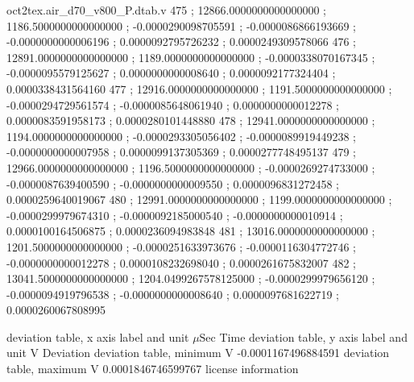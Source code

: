 \begin{filecontents}[overwrite]{oct2tex.air_d70_v800_P.dtab.v}
475 ; 12866.0000000000000000 ; 1186.5000000000000000 ; -0.0000290098705591 ; -0.0000086866193669 ; -0.0000000000006196 ; 0.0000092795726232 ; 0.0000249309578066
476 ; 12891.0000000000000000 ; 1189.0000000000000000 ; -0.0000338070167345 ; -0.0000095579125627 ; 0.0000000000008640 ; 0.0000092177324404 ; 0.0000338431564160
477 ; 12916.0000000000000000 ; 1191.5000000000000000 ; -0.0000294729561574 ; -0.0000085648061940 ; 0.0000000000012278 ; 0.0000083591958173 ; 0.0000280101448880
478 ; 12941.0000000000000000 ; 1194.0000000000000000 ; -0.0000293305056402 ; -0.0000089919449238 ; -0.0000000000007958 ; 0.0000099137305369 ; 0.0000277748495137
479 ; 12966.0000000000000000 ; 1196.5000000000000000 ; -0.0000269274733000 ; -0.0000087639400590 ; -0.0000000000009550 ; 0.0000096831272458 ; 0.0000259640019067
480 ; 12991.0000000000000000 ; 1199.0000000000000000 ; -0.0000299979674310 ; -0.0000092185000540 ; -0.0000000000010914 ; 0.0000100164506875 ; 0.0000236094983848
481 ; 13016.0000000000000000 ; 1201.5000000000000000 ; -0.0000251633973676 ; -0.0000116304772746 ; -0.0000000000012278 ; 0.0000108232698040 ; 0.0000261675832007
482 ; 13041.5000000000000000 ; 1204.0499267578125000 ; -0.0000299979656120 ; -0.0000094919796538 ; -0.0000000000008640 ; 0.0000097681622719 ; 0.0000260067808995
\end{filecontents}
\expandafter\def\csname oct2tex.air_d70_v800_P.dtabxlbl.d\endcsname{deviation table, x axis label and unit}
\expandafter\def\csname oct2tex.air_d70_v800_P.dtabxlbl.u\endcsname{\ensuremath{\mu\text{Sec}}}
\expandafter\def\csname oct2tex.air_d70_v800_P.dtabxlbl.v\endcsname{Time}
\expandafter\def\csname oct2tex.air_d70_v800_P.dtabylbl.d\endcsname{deviation table, y axis label and unit}
\expandafter\def\csname oct2tex.air_d70_v800_P.dtabylbl.u\endcsname{\ensuremath{\text{V}}}
\expandafter\def\csname oct2tex.air_d70_v800_P.dtabylbl.v\endcsname{Deviation}
\expandafter\def\csname oct2tex.air_d70_v800_P.dtabmin.d\endcsname{deviation table, minimum}
\expandafter\def\csname oct2tex.air_d70_v800_P.dtabmin.u\endcsname{\ensuremath{\text{V}}}
\expandafter\def\csname oct2tex.air_d70_v800_P.dtabmin.v\endcsname{-0.0001167496884591}
\expandafter\def\csname oct2tex.air_d70_v800_P.dtabmax.d\endcsname{deviation table, maximum}
\expandafter\def\csname oct2tex.air_d70_v800_P.dtabmax.u\endcsname{\ensuremath{\text{V}}}
\expandafter\def\csname oct2tex.air_d70_v800_P.dtabmax.v\endcsname{0.0001846746599767}
\expandafter\def\csname oct2tex.air_d70_v800_P.license_info.d\endcsname{license information}
